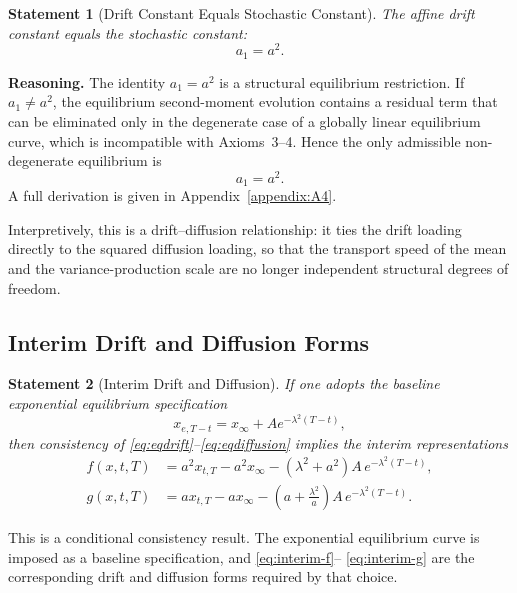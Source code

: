 \documentclass[12pt]{article}
\theoremstyle{statementstyle}
\newtheorem{statement}{Statement}[section]
\begin{document}
\begin{statement}[Drift Constant Equals Stochastic Constant]
\label{stmt:a1eqasq}
\emph{
The affine drift constant equals the stochastic constant:
}
\[
a_{1}=a^{2}.
\tag{3.4.1}
\]
\end{statement}

\medskip

\noindent\textbf{Reasoning.}
The identity \(a_{1}=a^{2}\) is a structural equilibrium restriction.
If \(a_{1}\neq a^{2}\), the equilibrium second-moment evolution contains a
residual term that can be eliminated only in the degenerate case of a globally
linear equilibrium curve, which is incompatible with Axioms~3--4. Hence the
only admissible non-degenerate equilibrium is
\[
a_{1}=a^{2}.
\]
A full derivation is given in Appendix~\ref{appendix:A4}.

Interpretively, this is a drift--diffusion relationship: it ties the
drift loading directly to the squared diffusion loading, so that the
transport speed of the mean and the variance-production scale are no
longer independent structural degrees of freedom.

\subsection{Interim Drift and Diffusion Forms}

\begin{statement}[Interim Drift and Diffusion]
\label{stmt:interim}
\emph{
If one adopts the baseline exponential equilibrium specification
\[
x_{e,T-t}=x_{\infty}+A e^{-\lambda^{2}(T-t)},
\]
then consistency of \eqref{eq:eqdrift}--\eqref{eq:eqdiffusion} implies
the interim representations
}
\begin{align}
f(x,t,T)
&=
a^{2}x_{t,T}
-
a^{2}x_{\infty}
-
(\lambda^{2}+a^{2})A\, e^{-\lambda^{2}(T-t)},
\tag{3.5.1a}\label{eq:interim-f}\\[0.3em]
g(x,t,T)
&=
a x_{t,T}
-
a x_{\infty}
-
\left(a + \frac{\lambda^{2}}{a}\right)
A\,e^{-\lambda^{2}(T-t)}.
\tag{3.5.1b}\label{eq:interim-g}
\end{align}
\end{statement}

\medskip

This is a conditional consistency result. The exponential equilibrium
curve is imposed as a baseline specification, and \eqref{eq:interim-f}--
\eqref{eq:interim-g} are the corresponding drift and diffusion forms
required by that choice.
\end{document}
